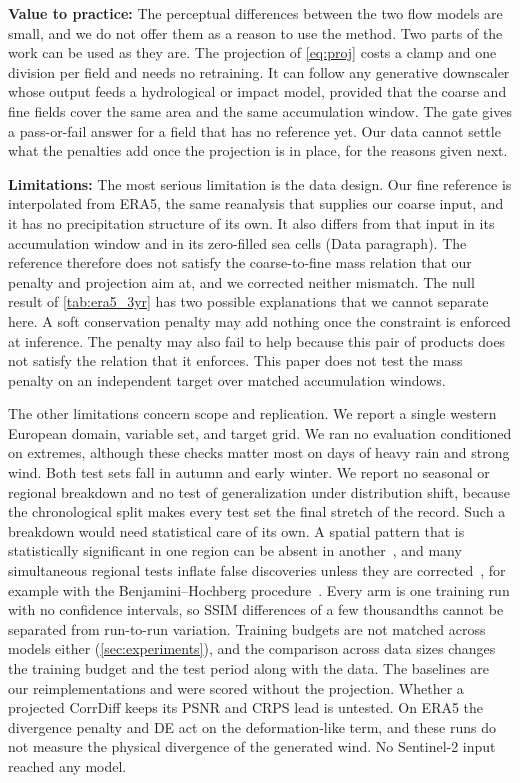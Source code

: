 \documentclass[sigconf,nonacm]{acmart}
\begin{document}
\textbf{Value to practice:} The perceptual differences between the two flow models are small, and we do not offer them as a reason to use the method. Two parts of the work can be used as they are. The projection of \cref{eq:proj} costs a clamp and one division per field and needs no retraining. It can follow any generative downscaler whose output feeds a hydrological or impact model, provided that the coarse and fine fields cover the same area and the same accumulation window. The gate gives a pass-or-fail answer for a field that has no reference yet. Our data cannot settle what the penalties add once the projection is in place, for the reasons given next.

\textbf{Limitations:} The most serious limitation is the data design. Our fine reference is interpolated from ERA5, the same reanalysis that supplies our coarse input, and it has no precipitation structure of its own. It also differs from that input in its accumulation window and in its zero-filled sea cells (Data paragraph). The reference therefore does not satisfy the coarse-to-fine mass relation that our penalty and projection aim at, and we corrected neither mismatch. The null result of \cref{tab:era5_3yr} has two possible explanations that we cannot separate here. A soft conservation penalty may add nothing once the constraint is enforced at inference. The penalty may also fail to help because this pair of products does not satisfy the relation that it enforces. This paper does not test the mass penalty on an independent target over matched accumulation windows.

The other limitations concern scope and replication. We report a single western European domain, variable set, and target grid. We ran no evaluation conditioned on extremes, although these checks matter most on days of heavy rain and strong wind. Both test sets fall in autumn and early winter. We report no seasonal or regional breakdown and no test of generalization under distribution shift, because the chronological split makes every test set the final stretch of the record. Such a breakdown would need statistical care of its own. A spatial pattern that is statistically significant in one region can be absent in another~\citep{ghosh2022geographically}, and many simultaneous regional tests inflate false discoveries unless they are corrected~\citep{ghosh2023false}, for example with the Benjamini--Hochberg procedure~\citep{ghosh2024taxonomy}. Every arm is one training run with no confidence intervals, so SSIM differences of a few thousandths cannot be separated from run-to-run variation. Training budgets are not matched across models either (\cref{sec:experiments}), and the comparison across data sizes changes the training budget and the test period along with the data. The baselines are our reimplementations and were scored without the projection. Whether a projected CorrDiff keeps its PSNR and CRPS lead is untested. On ERA5 the divergence penalty and DE act on the deformation-like term, and these runs do not measure the physical divergence of the generated wind. No Sentinel-2 input reached any model.
\end{document}
